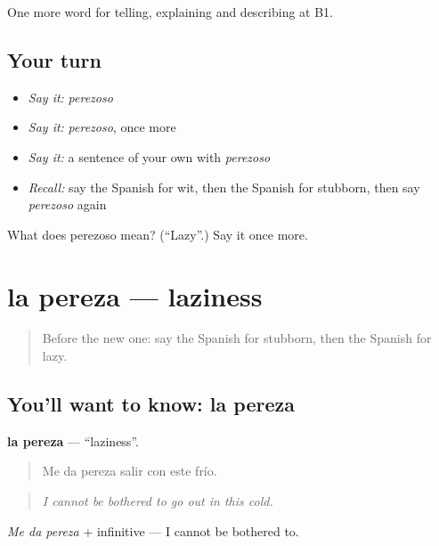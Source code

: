 \begin{grammarlens}[title={What you've built}]
One more word for telling, explaining and describing at B1.
\end{grammarlens}

\subsection*{Your turn}
\begin{itemize}
\raggedright
  \item \emph{Say it:} \emph{perezoso}
  \item \emph{Say it:} \emph{perezoso}, once more
  \item \emph{Say it:} a sentence of your own with \emph{perezoso}
  \item \emph{Recall:} say the Spanish for wit, then the Spanish for stubborn, then say \emph{perezoso} again
\end{itemize}

\begin{tcolorbox}[breakable,colback=teal!4,colframe=teal!35!black,title={Before you move on}]
What does perezoso mean? (\textquotedblleft{}Lazy\textquotedblright{}.) Say it once more.
\end{tcolorbox}
\section[la pereza]{la pereza — laziness}

\label{lesson:ES-C729-pereza}



\begin{quote}
Before the new one: say the Spanish for stubborn, then the Spanish for lazy.
\end{quote}

\subsection*{You'll want to know: la pereza}
\textbf{la pereza} — \textquotedblleft{}laziness\textquotedblright{}.

\begin{quote}
Me da pereza salir con este frío.
\end{quote}

\begin{quote}
\emph{I cannot be bothered to go out in this cold.}
\end{quote}

\emph{Me da pereza} + infinitive — I cannot be bothered to.

